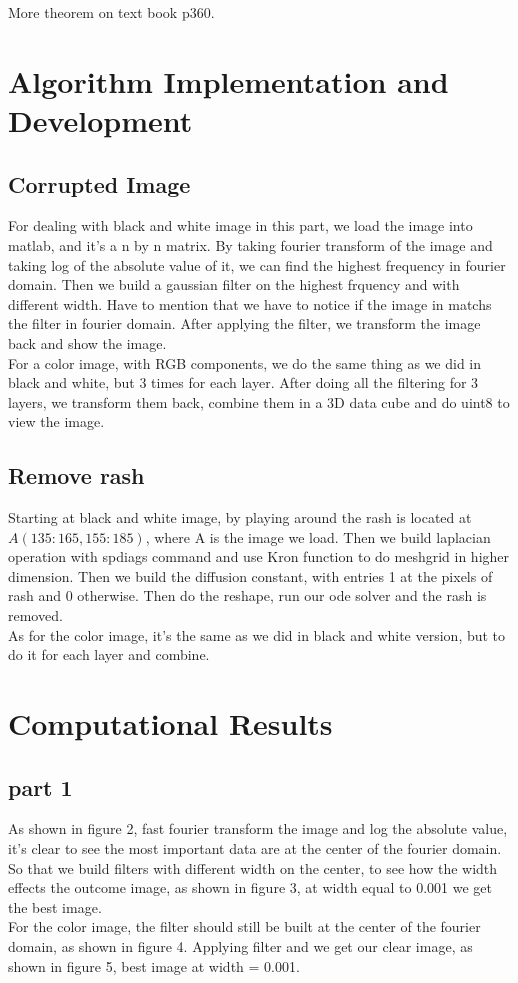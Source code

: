 \documentclass[12pt,letterpaper]{article}
\begin{document}
More theorem on text book p360.


\section{Algorithm Implementation and Development}
\subsection{Corrupted Image}
For dealing with black and white image in this part, we load the image into matlab, and it's a n by n matrix. By taking fourier transform of the image and taking log of the absolute value of it, we can find the highest frequency in fourier domain.
Then we build a gaussian filter on the highest frquency and with different width.
Have to mention that we have to notice if the image in  matchs the filter in fourier domain.
After applying the filter, we transform the image back and show the image.\\

For a color image, with RGB components, we do the same thing as we did in black and white, but 3 times for each layer. After doing all the filtering for 3 layers, we transform them back, combine them in a 3D data cube and do uint8 to view the image.

\subsection{Remove rash}
Starting at black and white image, by playing around the rash is located at $A(135:165,155:185)$, where A is the image we load. Then we build laplacian operation with spdiags command and use Kron function to do meshgrid in higher dimension. Then we build the diffusion constant, with entries 1 at the pixels of rash and 0 otherwise. Then do the reshape, run our ode solver and the rash is removed.\\

As for the color image, it's the same as we did in black and white version, but to do it for each layer and combine.


\section{Computational Results}

\subsection{part 1}
As shown in figure 2, fast fourier transform the image and log the absolute value, it's clear to see the most important data are at the center of the fourier domain. So that we build filters with different width on the center, to see how the width effects the outcome image, as shown in figure 3, at width equal to 0.001 we get the best image.\\
For the color image, the filter should still be built at the center of the fourier domain, as shown in figure 4. Applying filter and we get our clear image, as shown in figure 5, best image at width = 0.001.
\end{document}
